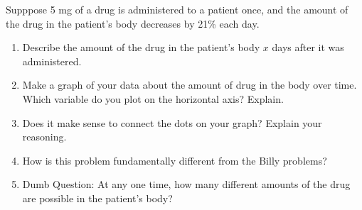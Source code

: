 \begin{prob}
Supppose 5 mg of a drug is administered to a patient once, and the amount of the drug in the patient's body decreases by 21\% each day.  
\begin{enumerate}
\item Describe the amount of the drug in the patient's body $x$ days after it was administered.  
\item Make a graph of your data about the amount of drug in the body over time.  Which variable do you plot on the horizontal axis?  Explain.  
\item Does it make sense to connect the dots on your graph?  Explain your reasoning.  

\item How is this problem fundamentally different from the Billy problems?  
\item Dumb Question:  At any one time, how many different amounts of the drug are possible in the patient's body?
\end{enumerate}
\end{prob}
